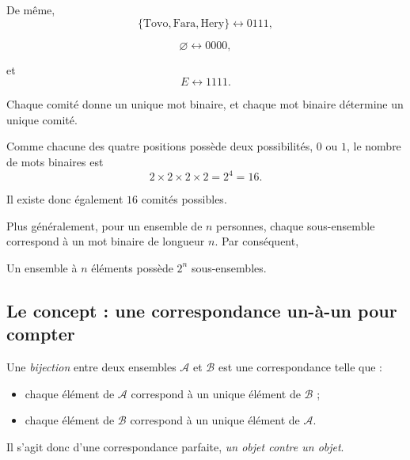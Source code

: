\documentclass[11pt]{article}
\begin{document}
De même,
\[
\{\text{Tovo},\text{Fara},\text{Hery}\}
\longleftrightarrow
0111,
\]

\[
\varnothing
\longleftrightarrow
0000,
\]

et
\[
E
\longleftrightarrow
1111.
\]

Chaque comité donne un unique mot binaire, et chaque mot binaire détermine
un unique comité.

Comme chacune des quatre positions possède deux possibilités, \(0\) ou \(1\),
le nombre de mots binaires est
\[
2\times2\times2\times2=2^4=16.
\]

Il existe donc également \(16\) comités possibles.

Plus généralement, pour un ensemble de \(n\) personnes, chaque sous-ensemble
correspond à un mot binaire de longueur \(n\). Par conséquent,

\begin{proposition}\label{prop:sous-ensembles}
Un ensemble à \(n\) éléments possède \(2^n\) sous-ensembles.
\end{proposition}

\subsection{Le concept : une correspondance un-à-un pour compter}\label{sec:concept-bijection}

\begin{definition}[Bijection]\label{def:bijection}
Une \emph{bijection} entre deux ensembles \(\mathcal A\) et \(\mathcal B\)
est une correspondance telle que :

\begin{itemize}
    \item chaque élément de \(\mathcal A\) correspond à un unique élément de
    \(\mathcal B\) ;
    \item chaque élément de \(\mathcal B\) correspond à un unique élément de
    \(\mathcal A\).
\end{itemize}
\end{definition}

Il s'agit donc d'une correspondance parfaite, \emph{un objet contre un objet}.

\begin{center}
\end{center}
\end{document}
